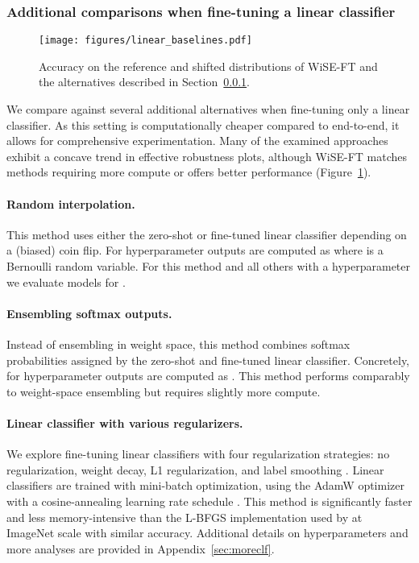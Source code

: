 \subsubsection{Additional comparisons when fine-tuning a linear classifier}
\label{sec:subsec_additional}

\begin{figure}
    \centering
    \texttt{[image: figures/linear\_baselines.pdf]}
    \caption{Accuracy on the reference and shifted distributions of WiSE-FT and the alternatives described in Section~\ref{sec:subsec_additional}.}
    \label{fig:baselines}
\end{figure}

We compare against several additional alternatives when fine-tuning only a linear classifier. As this setting is computationally cheaper compared to end-to-end, it allows for comprehensive experimentation. Many of the examined approaches exhibit a concave trend in effective robustness plots, although WiSE-FT matches methods requiring more compute or offers better performance (Figure~\ref{fig:baselines}).

\paragraph{Random interpolation.} This method uses either the zero-shot or fine-tuned linear classifier depending on a (biased) coin flip.
For hyperparameter  outputs are computed as  where  is a Bernoulli random variable.
For this method and all others with a hyperparameter  we evaluate models for .

\paragraph{Ensembling softmax outputs.} Instead of ensembling in weight space, this method combines softmax probabilities assigned by the zero-shot and fine-tuned linear classifier.
Concretely, for hyperparameter  outputs are computed as .
This method performs comparably to weight-space ensembling but requires slightly more compute.

\paragraph{Linear classifier with various regularizers.} We explore fine-tuning linear classifiers with four regularization strategies: no regularization, weight decay, L1 regularization, and label smoothing \cite{muller2019does}. Linear classifiers are trained with mini-batch optimization, using the AdamW optimizer \cite{loshchilov2018decoupled, paszke2019pytorch} with a cosine-annealing learning rate schedule \cite{loshchilov2016sgdr}.
This method is significantly faster and less memory-intensive than the L-BFGS implementation used by \citet{radford2021learning} at ImageNet scale with similar accuracy.
Additional details on hyperparameters and more analyses are provided in Appendix~\ref{sec:moreclf}. 

